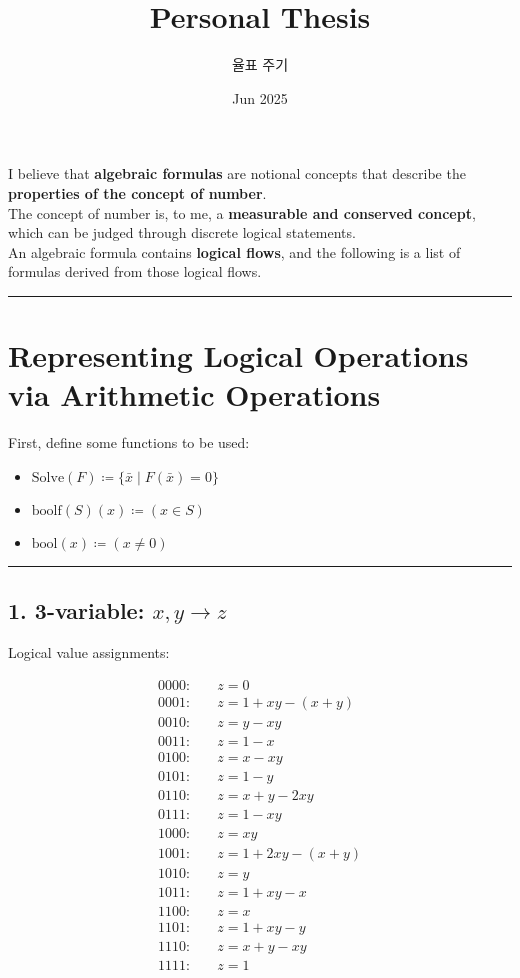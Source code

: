 \documentclass{article}
\title{Personal Thesis}
\author{율표 주기}
\date{Jun 2025}
\begin{document}
\maketitle

I believe that \textbf{algebraic formulas} are notional concepts that describe the \textbf{properties of the concept of number}.\\
The concept of number is, to me, a \textbf{measurable and conserved concept}, which can be judged through discrete logical statements.\\
An algebraic formula contains \textbf{logical flows}, and the following is a list of formulas derived from those logical flows.

\bigskip
\hrule
\bigskip

\section*{Representing Logical Operations via Arithmetic Operations}

First, define some functions to be used:

\begin{itemize}
    \item $\mathrm{Solve}(F) \coloneqq \{\bar{x} \mid F(\bar{x}) = 0 \}$
    \item $\mathrm{boolf}(S)(x) \coloneqq (x \in S)$
    \item $\mathrm{bool}(x) \coloneqq (x \neq 0)$
\end{itemize}

\bigskip
\hrule
\bigskip

\subsection*{1. 3-variable: $x, y \to z$}

Logical value assignments:

\begin{align*}
0000:& \quad z = 0 \\
0001:& \quad z = 1 + xy - (x + y) \\
0010:& \quad z = y - xy \\
0011:& \quad z = 1 - x \\
0100:& \quad z = x - xy \\
0101:& \quad z = 1 - y \\
0110:& \quad z = x + y - 2xy \\
0111:& \quad z = 1 - xy \\
1000:& \quad z = xy \\
1001:& \quad z = 1 + 2xy - (x + y) \\
1010:& \quad z = y \\
1011:& \quad z = 1 + xy - x \\
1100:& \quad z = x \\
1101:& \quad z = 1 + xy - y \\
1110:& \quad z = x + y - xy \\
1111:& \quad z = 1
\end{align*}
\end{document}

